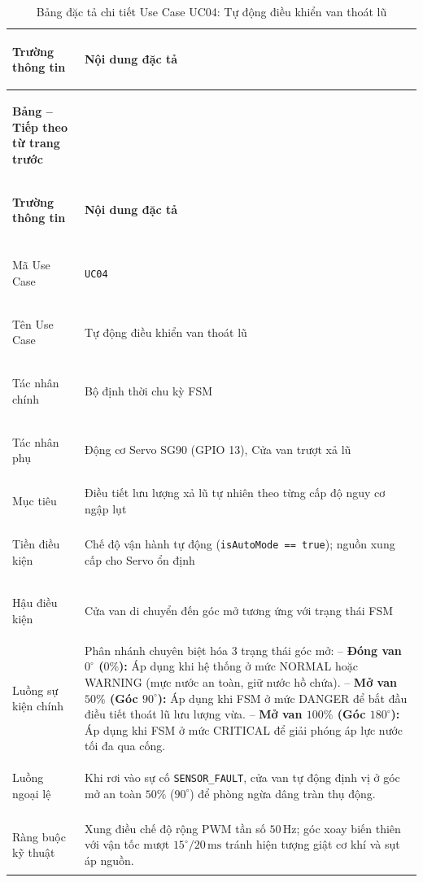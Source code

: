 \begingroup
\small
\renewcommand{\arraystretch}{1.2}
\begin{xltabular}{\textwidth}{|>{\bfseries\raggedright\arraybackslash}p{3.2cm}|X|}
\caption{Bảng đặc tả chi tiết Use Case UC04: Tự động điều khiển van thoát lũ} \label{tab:spec_uc04} \\
\hline
\textbf{Trường thông tin} & \textbf{Nội dung đặc tả} \\ \hline
\endfirsthead

{{\bfseries Bảng \thetable{} -- Tiếp theo từ trang trước}} \\
\hline
\textbf{Trường thông tin} & \textbf{Nội dung đặc tả} \\ \hline
\endhead

\hline {} \\ \hline
\endfoot

\hline
\endlastfoot
Mã Use Case & \texttt{UC04} \\ \hline
Tên Use Case & Tự động điều khiển van thoát lũ \\ \hline
Tác nhân chính & Bộ định thời chu kỳ FSM \\ \hline
Tác nhân phụ & Động cơ Servo SG90 (GPIO 13), Cửa van trượt xả lũ \\ \hline
Mục tiêu & Điều tiết lưu lượng xả lũ tự nhiên theo từng cấp độ nguy cơ ngập lụt \\ \hline
Tiền điều kiện & Chế độ vận hành tự động (\texttt{isAutoMode == true}); nguồn xung cấp cho Servo ổn định \\ \hline
Hậu điều kiện & Cửa van di chuyển đến góc mở tương ứng với trạng thái FSM \\ \hline
Luồng sự kiện chính & 
Phân nhánh chuyên biệt hóa 3 trạng thái góc mở: \newline
-- \textbf{Đóng van $0^\circ$ ($0\%$):} Áp dụng khi hệ thống ở mức NORMAL hoặc WARNING (mực nước an toàn, giữ nước hồ chứa). \newline
-- \textbf{Mở van $50\%$ (Góc $90^\circ$):} Áp dụng khi FSM ở mức DANGER để bắt đầu điều tiết thoát lũ lưu lượng vừa. \newline
-- \textbf{Mở van $100\%$ (Góc $180^\circ$):} Áp dụng khi FSM ở mức CRITICAL để giải phóng áp lực nước tối đa qua cống. \\ \hline
Luồng ngoại lệ & Khi rơi vào sự cố \texttt{SENSOR\_FAULT}, cửa van tự động định vị ở góc mở an toàn $50\%$ ($90^\circ$) để phòng ngừa dâng tràn thụ động. \\ \hline
Ràng buộc kỹ thuật & Xung điều chế độ rộng PWM tần số $50\,\text{Hz}$; góc xoay biến thiên với vận tốc mượt $15^\circ / 20\,\text{ms}$ tránh hiện tượng giật cơ khí và sụt áp nguồn. \\ \hline

\end{xltabular}
\endgroup

